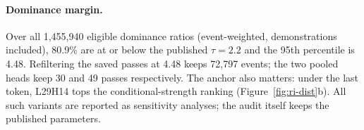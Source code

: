 \paragraph{Dominance margin.}
Over all 1,455,940 eligible dominance ratios (event-weighted, demonstrations
included), 80.9\% are at or below the published $\tau{=}2.2$ and the 95th percentile
is 4.48. Refiltering the saved passes at 4.48 keeps 72,797 events; the two pooled
heads keep 30 and 49 passes respectively. The anchor also matters: under the last
token, L29H14 tops the conditional-strength ranking (Figure~\ref{fig:ri-dist}b). All such variants are reported
as sensitivity analyses; the audit itself keeps the published parameters.

